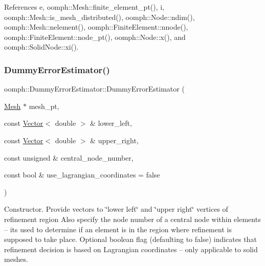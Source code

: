 References e, oomph\+::\+Mesh\+::finite\+\_\+element\+\_\+pt(), i, oomph\+::\+Mesh\+::is\+\_\+mesh\+\_\+distributed(), oomph\+::\+Node\+::ndim(), oomph\+::\+Mesh\+::nelement(), oomph\+::\+Finite\+Element\+::nnode(), oomph\+::\+Finite\+Element\+::node\+\_\+pt(), oomph\+::\+Node\+::x(), and oomph\+::\+Solid\+Node\+::xi().

\mbox{\label{classoomph_1_1DummyErrorEstimator_ac08dd82bba49368bb49eb7f58778778f}} 
\subsubsection{\texorpdfstring{Dummy\+Error\+Estimator()}{DummyErrorEstimator()}\hspace{0.1cm}{\footnotesize\ttfamily [2/3]}}
{\footnotesize\ttfamily oomph\+::\+Dummy\+Error\+Estimator\+::\+Dummy\+Error\+Estimator (\begin{DoxyParamCaption}\item[{\hyperlink{classoomph_1_1Mesh}{Mesh} $\ast$}]{mesh\+\_\+pt,  }\item[{const \hyperlink{classoomph_1_1Vector}{Vector}$<$ double $>$ \&}]{lower\+\_\+left,  }\item[{const \hyperlink{classoomph_1_1Vector}{Vector}$<$ double $>$ \&}]{upper\+\_\+right,  }\item[{const unsigned \&}]{central\+\_\+node\+\_\+number,  }\item[{const bool \&}]{use\+\_\+lagrangian\+\_\+coordinates = {\ttfamily false} }\end{DoxyParamCaption})\hspace{0.3cm}{\ttfamily [inline]}}



Constructor. Provide vectors to \char`\"{}lower left\char`\"{} and \char`\"{}upper right\char`\"{} vertices of refinement region Also specify the node number of a central node within elements -- it\textquotesingle{}s used to determine if an element is in the region where refinement is supposed to take place. Optional boolean flag (defaulting to false) indicates that refinement decision is based on Lagrangian coordinates -- only applicable to solid meshes. 



